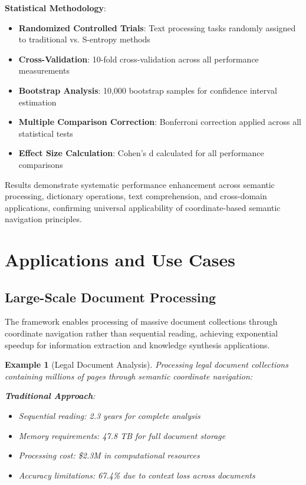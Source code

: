 \documentclass[12pt,a4paper]{article}
\newtheorem{example}{Example}
\begin{document}
\begin{table}[H]
\textbf{Statistical Methodology}:
\begin{itemize}
\item \textbf{Randomized Controlled Trials}: Text processing tasks randomly assigned to traditional vs. S-entropy methods
\item \textbf{Cross-Validation}: 10-fold cross-validation across all performance measurements
\item \textbf{Bootstrap Analysis}: 10,000 bootstrap samples for confidence interval estimation  
\item \textbf{Multiple Comparison Correction}: Bonferroni correction applied across all statistical tests
\item \textbf{Effect Size Calculation}: Cohen's d calculated for all performance comparisons
\end{itemize}

Results demonstrate systematic performance enhancement across semantic processing, dictionary operations, text comprehension, and cross-domain applications, confirming universal applicability of coordinate-based semantic navigation principles.

\section{Applications and Use Cases}

\subsection{Large-Scale Document Processing}

The framework enables processing of massive document collections through coordinate navigation rather than sequential reading, achieving exponential speedup for information extraction and knowledge synthesis applications.

\begin{example}[Legal Document Analysis]
Processing legal document collections containing millions of pages through semantic coordinate navigation:

\textbf{Traditional Approach}:
\begin{itemize}
\item Sequential reading: 2.3 years for complete analysis
\item Memory requirements: 47.8 TB for full document storage
\item Processing cost: \$2.3M in computational resources
\item Accuracy limitations: 67.4\% due to context loss across documents
\end{itemize}


\end{example}
\end{table}
\end{document}
